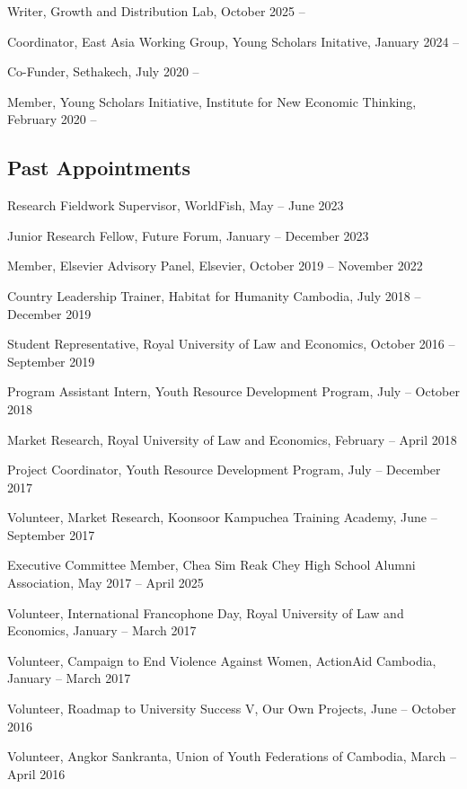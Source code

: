 \documentclass[10pt,a4paper]{article}
\begin{document}
	Writer, Growth and Distribution Lab, October 2025 --
	
	Coordinator, East Asia Working Group, Young Scholars Initative, January 2024 --
		
	Co-Funder, Sethakech, July 2020 --
	
	Member, Young Scholars Initiative, Institute for New Economic Thinking, February 2020 --

\subsection*{Past Appointments}

	
	Research Fieldwork Supervisor, WorldFish, May -- June 2023

	Junior Research Fellow, Future Forum, January -- December 2023
	
	Member, Elsevier Advisory Panel, Elsevier, October 2019 -- November 2022
	
	Country Leadership Trainer, Habitat for Humanity Cambodia, July 2018 -- December 2019
	
	Student Representative, Royal University of Law and Economics, October 2016 -- September 2019
	
	Program Assistant Intern, Youth Resource Development Program, July -- October 2018
	
	Market Research, Royal University of Law and Economics, February -- April 2018
	
	Project Coordinator, Youth Resource Development Program, July -- December 2017
	
	Volunteer, Market Research, Koonsoor Kampuchea Training Academy, June -- September 2017
	
	Executive Committee Member, Chea Sim Reak Chey High School Alumni Association, May 2017 – April 2025
	
	Volunteer, International Francophone Day,  Royal University of Law and Economics, January -- March 2017
	
	Volunteer, Campaign to End Violence Against Women, ActionAid Cambodia, January -- March 2017
	
	Volunteer, Roadmap to University Success V, Our Own Projects, June -- October 2016
	
	Volunteer, Angkor Sankranta, Union of Youth Federations of Cambodia, March -- April 2016
\end{document}
